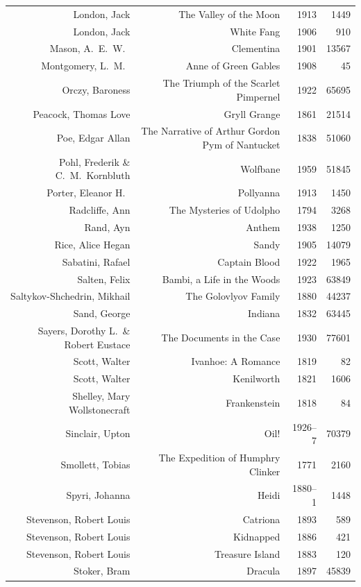 \documentclass{article} %
\begin{document}
\begin{center}
\begin{tabularx}{\linewidth}{RRrr}
    London, Jack & The Valley of the Moon & 1913 & 1449 \\
    London, Jack & White Fang & 1906 & 910 \\
    Mason, A.\ E.\ W.\ & Clementina & 1901 & 13567 \\
    Montgomery, L.\ M.\ & Anne of Green Gables & 1908 & 45 \\
    Orczy, Baroness & The Triumph of the Scarlet Pimpernel & 1922 & 65695 \\
    Peacock, Thomas Love & Gryll Grange & 1861 & 21514 \\
    Poe, Edgar Allan & The Narrative of Arthur Gordon Pym of Nantucket & 1838 & 51060 \\
    Pohl, Frederik \& C.\ M.\ Kornbluth & Wolfbane & 1959 & 51845 \\
    Porter, Eleanor H.\ & Pollyanna & 1913 & 1450 \\
    Radcliffe, Ann & The Mysteries of Udolpho & 1794 & 3268 \\
    Rand, Ayn & Anthem & 1938 & 1250 \\
    Rice, Alice Hegan & Sandy & 1905 & 14079 \\
    Sabatini, Rafael & Captain Blood & 1922 & 1965 \\
    Salten, Felix & Bambi, a Life in the Woods & 1923 & 63849 \\
    Saltykov-Shchedrin, Mikhail & The Golovlyov Family & 1880 & 44237 \\
    Sand, George & Indiana & 1832 & 63445 \\
    Sayers, Dorothy L.\ \& Robert Eustace & The Documents in the Case & 1930 & 77601 \\
    Scott, Walter & Ivanhoe: A Romance & 1819 & 82 \\
    Scott, Walter & Kenilworth & 1821 & 1606 \\
    Shelley, Mary Wollstonecraft & Frankenstein & 1818 & 84 \\
    Sinclair, Upton & Oil! & 1926--7 & 70379 \\
    Smollett, Tobias & The Expedition of Humphry Clinker & 1771 & 2160 \\
    Spyri, Johanna & Heidi & 1880--1 & 1448 \\
    Stevenson, Robert Louis & Catriona & 1893 & 589 \\
    Stevenson, Robert Louis & Kidnapped & 1886 & 421 \\
    Stevenson, Robert Louis & Treasure Island & 1883 & 120 \\
    Stoker, Bram & Dracula & 1897 & 45839 \\

\end{tabularx}
\end{center}
\end{document}
